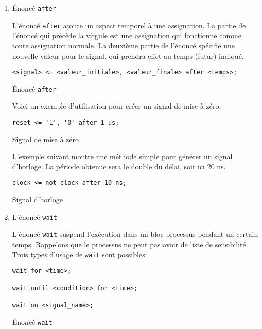 \documentclass[letter, oneside]{book}
\begin{document}
\begin{enumerate}
\item Énoncé \texttt{after}
\label{sec:orga1b866b}

L'énoncé \texttt{after} ajoute un aspect temporel à une assignation. La
partie de l'énoncé qui précède la virgule est une assignation qui
fonctionne comme toute assignation normale. La deuxième partie de
l'énoncé spécifie une nouvelle valeur pour le signal, qui prendra effet
au temps (futur) indiqué.

\begin{listing}[htbp]
\begin{verbatim}
<signal> <= <valeur_initiale>, <valeur_finale> after <temps>;
\end{verbatim}
\caption{Énoncé \texttt{after}}
\end{listing}

Voici un exemple d'utilisation pour créer un signal de mise à zéro:

\begin{listing}[htbp]
\begin{verbatim}
reset <= '1', '0' after 1 us;
\end{verbatim}
\caption{Signal de mise à zéro}
\end{listing}

L'exemple suivant montre une méthode simple pour générer un signal
d'horloge. La période obtenue sera le double du délai, soit ici 20 ns.

\begin{listing}[htbp]
\begin{verbatim}
clock <= not clock after 10 ns;
\end{verbatim}
\caption{Signal d'horloge}
\end{listing}

\item L'énoncé \texttt{wait}
\label{sec:orgf819cfa}

L'énoncé \texttt{wait} suspend l'exécution dans un bloc processus pendant un
certain temps. Rappelons que le processus ne peut pas avoir de liste
de sensibilité. Trois types d'usage de \texttt{wait} sont possibles:

\begin{listing}[htbp]
\begin{verbatim}
wait for <time>; 

wait until <condition> for <time>;

wait on <signal_name>;
\end{verbatim}
\caption{Énoncé \texttt{wait}}
\end{listing}


\end{enumerate}
\end{document}

